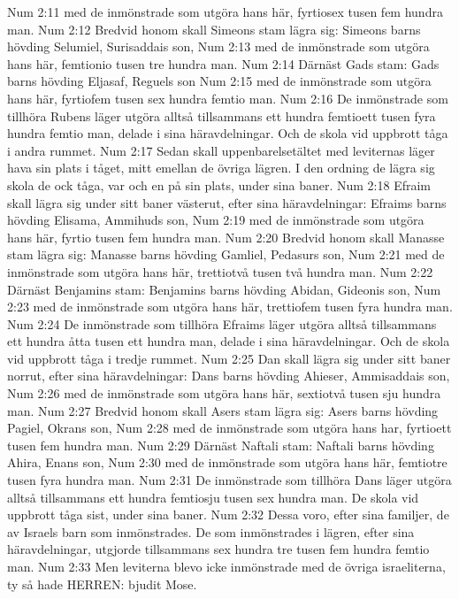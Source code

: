 Num 2:11  med de inmönstrade som utgöra hans här, fyrtiosex tusen fem hundra man.
Num 2:12  Bredvid honom skall Simeons stam lägra sig: Simeons barns hövding Selumiel, Surisaddais son,
Num 2:13  med de inmönstrade som utgöra hans här, femtionio tusen tre hundra man.
Num 2:14  Därnäst Gads stam: Gads barns hövding Eljasaf, Reguels son
Num 2:15  med de inmönstrade som utgöra hans här, fyrtiofem tusen sex hundra femtio man.
Num 2:16  De inmönstrade som tillhöra Rubens läger utgöra alltså tillsammans ett hundra femtioett tusen fyra hundra femtio man, delade i sina häravdelningar. Och de skola vid uppbrott tåga i andra rummet.
Num 2:17  Sedan skall uppenbarelsetältet med leviternas läger hava sin plats i tåget, mitt emellan de övriga lägren. I den ordning de lägra sig skola de ock tåga, var och en på sin plats, under sina baner.
Num 2:18  Efraim skall lägra sig under sitt baner västerut, efter sina häravdelningar: Efraims barns hövding Elisama, Ammihuds son,
Num 2:19  med de inmönstrade som utgöra hans här, fyrtio tusen fem hundra man.
Num 2:20  Bredvid honom skall Manasse stam lägra sig: Manasse barns hövding Gamliel, Pedasurs son,
Num 2:21  med de inmönstrade som utgöra hans här, trettiotvå tusen två hundra man.
Num 2:22  Därnäst Benjamins stam: Benjamins barns hövding Abidan, Gideonis son,
Num 2:23  med de inmönstrade som utgöra hans här, trettiofem tusen fyra hundra man.
Num 2:24  De inmönstrade som tillhöra Efraims läger utgöra alltså tillsammans ett hundra åtta tusen ett hundra man, delade i sina häravdelningar. Och de skola vid uppbrott tåga i tredje rummet.
Num 2:25  Dan skall lägra sig under sitt baner norrut, efter sina häravdelningar: Dans barns hövding Ahieser, Ammisaddais son,
Num 2:26  med de inmönstrade som utgöra hans här, sextiotvå tusen sju hundra man.
Num 2:27  Bredvid honom skall Asers stam lägra sig: Asers barns hövding Pagiel, Okrans son,
Num 2:28  med de inmönstrade som utgöra hans har, fyrtioett tusen fem hundra man.
Num 2:29  Därnäst Naftali stam: Naftali barns hövding Ahira, Enans son,
Num 2:30  med de inmönstrade som utgöra hans här, femtiotre tusen fyra hundra man.
Num 2:31  De inmönstrade som tillhöra Dans läger utgöra alltså tillsammans ett hundra femtiosju tusen sex hundra man. De skola vid uppbrott tåga sist, under sina baner.
Num 2:32  Dessa voro, efter sina familjer, de av Israels barn som inmönstrades. De som inmönstrades i lägren, efter sina häravdelningar, utgjorde tillsammans sex hundra tre tusen fem hundra femtio man.
Num 2:33  Men leviterna blevo icke inmönstrade med de övriga israeliterna, ty så hade HERREN: bjudit Mose.
